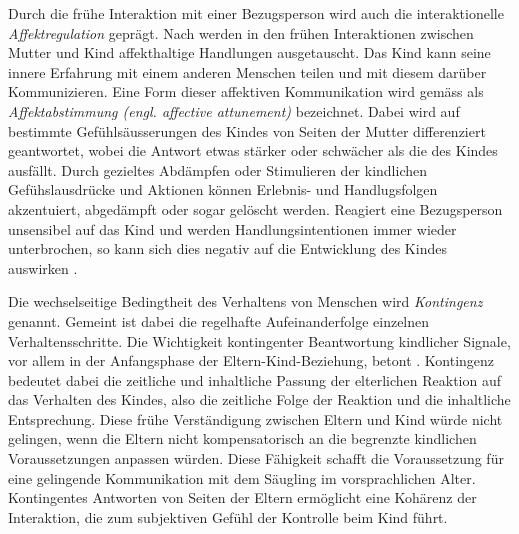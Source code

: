 Durch die frühe Interaktion mit einer Bezugsperson wird auch die interaktionelle \textit{Affektregulation} geprägt. Nach  werden in den frühen Interaktionen zwischen Mutter und Kind affekthaltige Handlungen ausgetauscht. Das Kind kann seine innere Erfahrung mit einem anderen Menschen teilen und mit diesem darüber Kommunizieren. Eine Form dieser affektiven Kommunikation wird gemäss  als \textit{Affektabstimmung (engl. affective attunement)} bezeichnet. Dabei wird auf bestimmte Gefühlsäusserungen des Kindes von Seiten der Mutter differenziert geantwortet, wobei die Antwort etwas stärker oder schwächer als die des Kindes ausfällt. Durch gezieltes Abdämpfen oder Stimulieren der kindlichen Gefühslausdrücke und Aktionen können Erlebnis- und Handlugsfolgen akzentuiert, abgedämpft oder sogar gelöscht werden. Reagiert eine Bezugsperson unsensibel auf das Kind und werden Handlungsintentionen immer wieder unterbrochen, so kann sich dies negativ auf die Entwicklung des Kindes auswirken \cite{Resch1999}.

Die wechselseitige Bedingtheit des Verhaltens von Menschen wird \textit{Kontingenz} genannt. Gemeint ist dabei die regelhafte Aufeinanderfolge einzelnen Verhaltensschritte. Die Wichtigkeit kontingenter Beantwortung kindlicher Signale, vor allem in der Anfangsphase der Eltern-Kind-Beziehung, betont . Kontingenz bedeutet dabei die zeitliche und inhaltliche Passung der elterlichen Reaktion auf das Verhalten des Kindes, also die zeitliche Folge der Reaktion und die inhaltliche Entsprechung. Diese frühe Verständigung zwischen Eltern und Kind würde nicht gelingen, wenn die Eltern nicht kompensatorisch an die begrenzte kindlichen Voraussetzungen anpassen würden. Diese Fähigkeit schafft die Voraussetzung für eine gelingende Kommunikation mit dem Säugling im vorsprachlichen Alter. Kontingentes Antworten von Seiten der Eltern ermöglicht eine Kohärenz der Interaktion, die zum subjektiven Gefühl der Kontrolle beim Kind führt.

